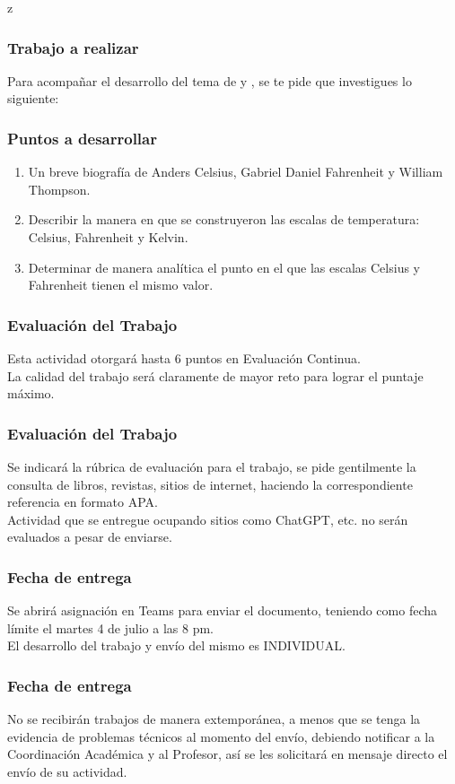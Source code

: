 z\documentclass[14pt]{beamer}
\begin{document}
\begin{frame}
\frametitle{Trabajo a realizar}
Para acompañar el desarrollo del tema de  y , se te pide que investigues lo siguiente:
\end{frame}
\begin{frame}
\frametitle{Puntos a desarrollar}
\begin{enumerate}[<+->]
\item Un breve biografía de Anders Celsius, Gabriel Daniel Fahrenheit y William Thompson.
\item Describir la manera en que se construyeron las escalas de temperatura: Celsius, Fahrenheit y Kelvin.
\item Determinar de manera analítica el punto en el que las escalas Celsius y Fahrenheit tienen el mismo valor.
\end{enumerate}
\end{frame}
\begin{frame}
\frametitle{Evaluación del Trabajo}
Esta actividad otorgará hasta $6$ puntos en Evaluación Continua.
\\
\bigskip
\pause
La calidad del trabajo será claramente de mayor reto para lograr el puntaje máximo.
\end{frame}
\begin{frame}
\frametitle{Evaluación del Trabajo}
Se indicará la rúbrica de evaluación para el trabajo, se pide gentilmente la consulta de libros, revistas, sitios de internet, haciendo la correspondiente referencia en formato APA.
\\
\bigskip
\pause
Actividad que se entregue ocupando sitios como ChatGPT, etc. no serán evaluados a pesar de enviarse.
\end{frame}
\begin{frame}
\frametitle{Fecha de entrega}
Se abrirá asignación en Teams para enviar el documento, teniendo como fecha límite el martes 4 de julio a las 8 pm.
\\
\bigskip
\pause
El desarrollo del trabajo y envío del mismo es INDIVIDUAL.
\end{frame}
\begin{frame}
\frametitle{Fecha de entrega}
No se recibirán trabajos de manera extemporánea, a menos que se tenga la evidencia de problemas técnicos al momento del envío, debiendo notificar a la Coordinación Académica y al Profesor, \pause así se les solicitará en mensaje directo el envío de su actividad.
\end{frame}
\end{document}
